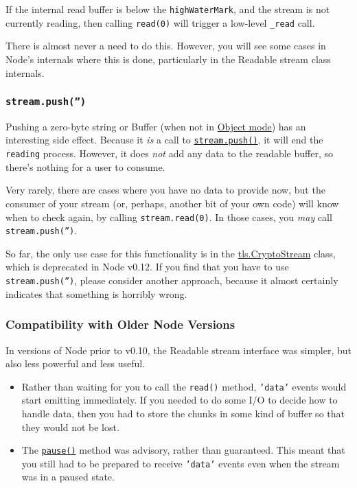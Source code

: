If the internal read buffer is below the \texttt{highWaterMark}, and the
stream is not currently reading, then calling \texttt{read(0)} will
trigger a low-level \texttt{\_read} call.

There is almost never a need to do this. However, you will see some
cases in Node's internals where this is done, particularly in the
Readable stream class internals.

\subsubsection{\texttt{stream.push('')}}

Pushing a zero-byte string or Buffer (when not in
\hyperref[stream\_object\_mode]{Object mode}) has an interesting side
effect. Because it \emph{is} a call to
\hyperref[stream\_readable\_push\_chunk\_encoding]{\texttt{stream.push()}},
it will end the \texttt{reading} process. However, it does \emph{not}
add any data to the readable buffer, so there's nothing for a user to
consume.

Very rarely, there are cases where you have no data to provide now, but
the consumer of your stream (or, perhaps, another bit of your own code)
will know when to check again, by calling \texttt{stream.read(0)}. In
those cases, you \emph{may} call \texttt{stream.push('')}.

So far, the only use case for this functionality is in the
\href{tls.html\#tls\_class\_cryptostream}{tls.CryptoStream} class, which
is deprecated in Node v0.12. If you find that you have to use
\texttt{stream.push('')}, please consider another approach, because it
almost certainly indicates that something is horribly wrong.

\subsubsection{Compatibility with Older Node Versions}

In versions of Node prior to v0.10, the Readable stream interface was
simpler, but also less powerful and less useful.

\begin{itemize}
\item
  Rather than waiting for you to call the \texttt{read()} method,
  \texttt{'data'} events would start emitting immediately. If you needed
  to do some I/O to decide how to handle data, then you had to store the
  chunks in some kind of buffer so that they would not be lost.
\item
  The \hyperref[stream\_readable\_pause]{\texttt{pause()}} method was
  advisory, rather than guaranteed. This meant that you still had to be
  prepared to receive \texttt{'data'} events even when the stream was in
  a paused state.
\end{itemize}

